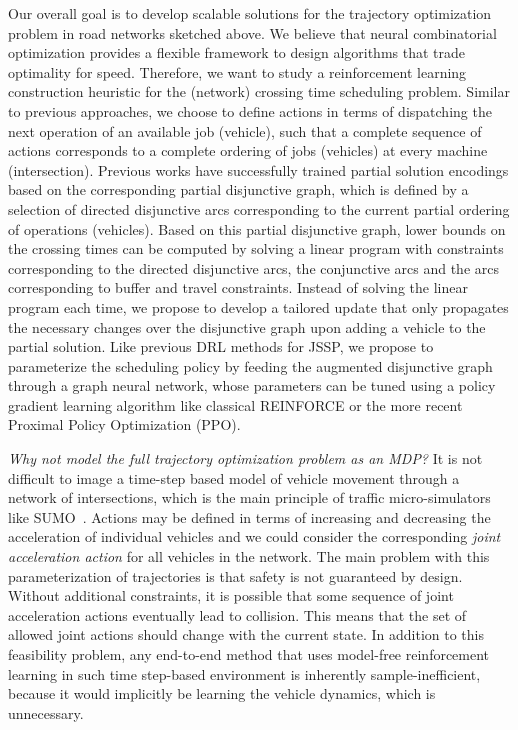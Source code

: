\documentclass[a4paper]{article}
\theoremstyle{definition}
\theoremstyle{plain}
\begin{document}
Our overall goal is to develop scalable solutions for the trajectory
optimization problem in road networks sketched above. We believe that neural
combinatorial optimization provides a flexible framework to design algorithms
that trade optimality for speed. Therefore, we want to study a reinforcement
learning construction heuristic for the (network) crossing time scheduling
problem.
Similar to previous approaches, we choose to define actions in terms of
dispatching the next operation of an available job (vehicle), such that a
complete sequence of actions corresponds to a complete ordering of jobs
(vehicles) at every machine (intersection).
Previous works have successfully trained partial solution encodings based on the
corresponding partial disjunctive graph, which is defined by a selection of
directed disjunctive arcs corresponding to the current partial ordering of
operations (vehicles).
Based on this partial disjunctive graph, lower bounds
on the crossing times can be computed by solving a linear program with
constraints corresponding to the directed disjunctive arcs, the conjunctive arcs
and the arcs corresponding to buffer and travel constraints.
Instead of solving the linear program each time, we propose to develop a
tailored update that only propagates the necessary changes over the disjunctive
graph upon adding a vehicle to the partial solution.
%
Like previous DRL methods for JSSP, we propose to parameterize the scheduling
policy by feeding the augmented disjunctive graph through a graph neural
network, whose parameters can be tuned using a policy gradient learning
algorithm like classical REINFORCE or the more recent Proximal Policy
Optimization (PPO).



\textit{Why not model the full trajectory optimization problem as an MDP?}
%
It is not difficult to image a time-step based model of vehicle movement through
a network of intersections, which is the main principle of traffic
micro-simulators like SUMO~\cite{lopezMicroscopicTrafficSimulation2018}. Actions may be defined in terms of increasing
and decreasing the acceleration of individual vehicles and we could consider the
corresponding \textit{joint acceleration action} for all vehicles in the network.
%
The main problem with this parameterization of trajectories is that safety is
not guaranteed by design. Without additional constraints, it is possible that
some sequence of joint acceleration actions eventually lead to collision. This
means that the set of allowed joint actions should change with the current
state.
%
In addition to this feasibility problem, any end-to-end method that uses
model-free reinforcement learning in such time step-based environment is
inherently sample-inefficient, because it would implicitly be learning the
vehicle dynamics, which is unnecessary.
\end{document}
